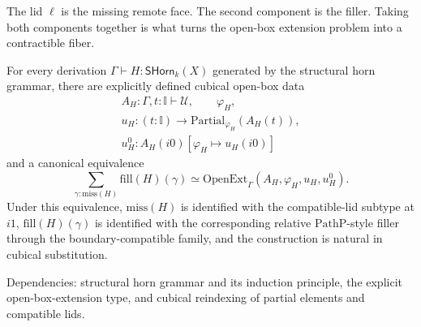 \documentclass{lmcs}
\begin{document}
The lid \(\ell\) is the missing remote face.  The second component is the filler.  Taking
both components together is what turns the open-box extension problem into a contractible
fiber.

\begin{lem}
\label{lem:horn-open-box}
For every derivation \(\Gamma\vdash H:\mathsf{SHorn}_k(X)\) generated by the structural horn
grammar, there are explicitly defined cubical open-box data
\[
  \begin{gathered}
  A_H:\Gamma,t:\mathbb I\vdash\mathcal U,\qquad \varphi_H,\\
  u_H:(t:\mathbb I)\to\mathrm{Partial}_{\varphi_H}(A_H(t)),\\
  u^0_H:A_H(i0)[\varphi_H\mapsto u_H(i0)]
  \end{gathered}
\]
and a canonical equivalence
\[
  \sum_{\gamma:\mathrm{miss}(H)}\mathrm{fill}(H)(\gamma)
  \simeq
  \mathrm{OpenExt}_{\Gamma}(A_H,\varphi_H,u_H,u^0_H).
\]
Under this equivalence, \(\mathrm{miss}(H)\) is identified with the compatible-lid subtype at
\(i1\), \(\mathrm{fill}(H)(\gamma)\) is identified with the corresponding relative
\(\mathrm{PathP}\)-style filler through the boundary-compatible family, and the construction
is natural in cubical substitution.

Dependencies: structural horn grammar and its induction principle, the explicit
open-box-extension type, and cubical reindexing of partial elements and compatible lids.
\end{lem}
\end{document}
